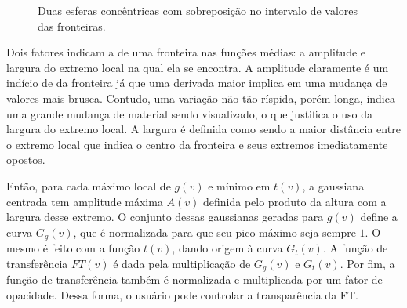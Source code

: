\begin{figure}[h]
	\centering
	\label{fig:m_double_sphere_disc}
	\caption{Duas esferas concêntricas com sobreposição no intervalo de valores das fronteiras.}
\end{figure}
	
	Dois fatores indicam a  de uma fronteira nas funções médias: a amplitude e largura do extremo local na qual ela se encontra. A amplitude claramente é um indício de  da fronteira já que uma derivada maior implica em uma mudança de valores mais brusca. Contudo, uma variação não tão ríspida, porém longa, indica uma grande mudança de material sendo visualizado, o que justifica o uso da largura do extremo local. A largura é definida como sendo a maior distância entre o extremo local que indica o centro da fronteira e seus extremos imediatamente opostos.
	
	Então, para cada máximo local de $ g(v) $ e mínimo em $ t(v) $, a gaussiana centrada tem amplitude máxima $ A(v) $ definida pelo produto da altura com a largura desse extremo. O conjunto dessas gaussianas geradas para $ g(v) $ define a curva $ G_{g}(v) $, que é normalizada para que seu pico máximo seja sempre $ 1 $. O mesmo é feito com a função $ t(v) $, dando origem à curva $ G_{t}(v) $. A função de transferência $ FT(v) $ é dada pela multiplicação de $ G_{g}(v) $ e $ G_{t}(v) $. Por fim, a função de transferência também é normalizada e multiplicada por um fator de opacidade. Dessa forma, o usuário pode controlar a transparência da FT.
	
